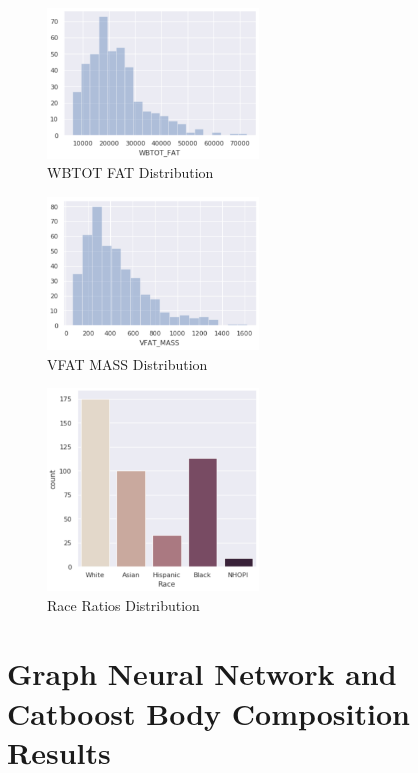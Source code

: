 \begin{figure}[h]
	\caption{WBTOT FAT Distribution}
	\centering
	\includegraphics[width=0.5\textwidth]{images/wbtot_fat.png}
\end{figure}


\begin{figure}[h]
	\caption{VFAT MASS Distribution}
	\centering
	\includegraphics[width=0.5\textwidth]{images/vfat_mass.png}
\end{figure}

\begin{figure}[h]
	\caption{Race Ratios Distribution}
	\centering
	\includegraphics[width=0.5\textwidth]{images/race_ratios.png}
\end{figure}


\section{Graph Neural Network and Catboost Body Composition Results}

